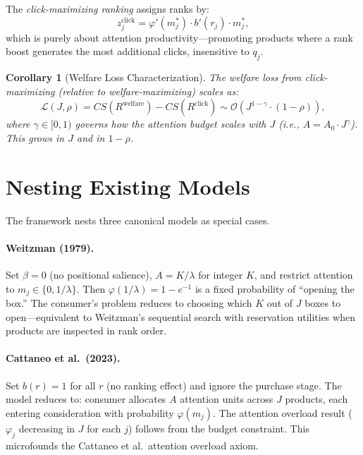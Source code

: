 \documentclass[12pt]{article}
\newtheorem{corollary}{Corollary}
\begin{document}
The \emph{click-maximizing ranking} assigns ranks by:
\begin{equation}\label{eq:click_index}
    z_j^{\text{click}} = \varphi'(m_j^*) \cdot b'(r_j) \cdot m_j^*,
\end{equation}
which is purely about attention productivity---promoting products where a rank boost generates the most additional clicks, insensitive to $q_j$.

\begin{corollary}[Welfare Loss Characterization]\label{cor:welfare_loss}
The welfare loss from click-maximizing (relative to welfare-maximizing) scales as:
\begin{equation}\label{eq:welfare_loss}
    \mathcal{L}(J, \rho) = CS(R^{\text{welfare}}) - CS(R^{\text{click}}) \sim \mathcal{O}\!\left(J^{1-\gamma} \cdot (1 - \rho)\right),
\end{equation}
where $\gamma \in [0, 1)$ governs how the attention budget scales with $J$ (i.e., $A = A_0 \cdot J^{\gamma}$). This grows in $J$ and in $1 - \rho$.
\end{corollary}

\section{Nesting Existing Models}\label{sec:nesting}

The framework nests three canonical models as special cases.

\paragraph{Weitzman (1979).}
Set $\beta = 0$ (no positional salience), $A = K/\lambda$ for integer $K$, and restrict attention to $m_j \in \{0, 1/\lambda\}$. Then $\varphi(1/\lambda) = 1 - e^{-1}$ is a fixed probability of ``opening the box.'' The consumer's problem reduces to choosing which $K$ out of $J$ boxes to open---equivalent to Weitzman's sequential search with reservation utilities when products are inspected in rank order.

\paragraph{Cattaneo et al.\ (2023).}
Set $b(r) = 1$ for all $r$ (no ranking effect) and ignore the purchase stage. The model reduces to: consumer allocates $A$ attention units across $J$ products, each entering consideration with probability $\varphi(m_j)$. The attention overload result ($\varphi_j$ decreasing in $J$ for each $j$) follows from the budget constraint. This microfounds the Cattaneo et al.\ attention overload axiom.
\end{document}
